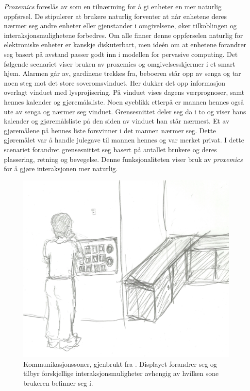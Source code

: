 \emph{Proxemics} foreslås av \citet{greenberg11} som en tilnærming for å gi enheter en mer naturlig oppførsel. De stipulerer at brukere naturlig forventer at når enhetene deres nærmer seg andre enheter eller gjenstander i omgivelsene, øker tilkoblingen og interaksjonsmulighetene forbedres. Om alle finner denne oppførselen naturlig for elektroniske enheter er kanskje diskuterbart, men ideén om at enhetene forandrer seg basert på avstand passer godt inn i modellen for pervasive computing. Det følgende scenariet viser bruken av proxemics og omgivelsesskjermer i et smart hjem. Alarmen går av, gardinene trekkes fra, beboeren står opp av senga og tar noen steg mot det store soveromsvinduet. Her dukker det opp informasjon overlagt vinduet med lysprojisering. På vinduet vises dagens værprognoser, samt hennes kalender og gjøremålsliste. Noen øyeblikk etterpå er mannen hennes også ute av senga og nærmer seg vinduet. Grensesnittet deler seg da i to og viser hans kalender og gjøremålsliste på den siden av vinduet han står nærmest. Et av gjøremålene på hennes liste forsvinner i det mannen nærmer seg. Dette gjøremålet var å handle julegave til mannen hennes og var merket privat. I dette scenariet forandret grensesnittet seg basert på antallet brukere og deres plassering, retning og bevegelse. Denne funksjonaliteten viser bruk av \emph{proxemics} for å gjøre interaksjonen mer naturlig.

\begin{figure}
\centering
\includegraphics[scale=0.4]{fig/buttons}
\caption{Kommunikasjonssoner, gjenbrukt fra \citet{streitz05}. Displayet forandrer seg og tilbyr forskjellige interaksjonsmuligheter avhengig av hvilken sone brukeren befinner seg i.}
\label{commzones}
\end{figure}

